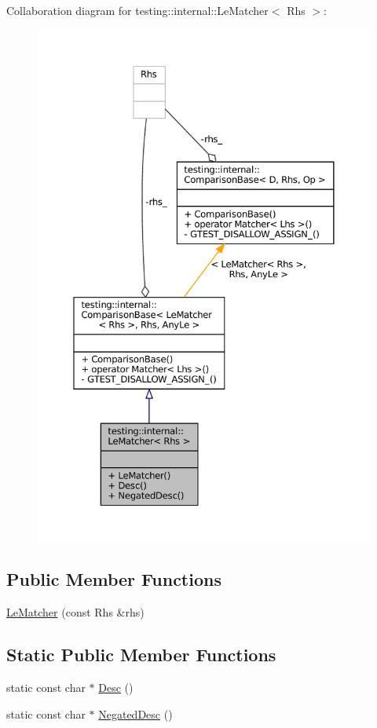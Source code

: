 Collaboration diagram for testing\+:\+:internal\+:\+:Le\+Matcher$<$ Rhs $>$\+:
\nopagebreak
\begin{figure}[H]
\begin{center}
\leavevmode
\includegraphics[width=350pt]{classtesting_1_1internal_1_1LeMatcher__coll__graph}
\end{center}
\end{figure}
\subsection*{Public Member Functions}
\begin{DoxyCompactItemize}
\item 
\hyperlink{classtesting_1_1internal_1_1LeMatcher_ae3dce3765263397fa5de202d45d0bdb5}{Le\+Matcher} (const Rhs \&rhs)
\end{DoxyCompactItemize}
\subsection*{Static Public Member Functions}
\begin{DoxyCompactItemize}
\item 
static const char $\ast$ \hyperlink{classtesting_1_1internal_1_1LeMatcher_adfef0084cb0f28503a40d7157699519b}{Desc} ()
\item 
static const char $\ast$ \hyperlink{classtesting_1_1internal_1_1LeMatcher_a01dada192b6f7139b66bbc198b3cb03b}{Negated\+Desc} ()
\end{DoxyCompactItemize}


